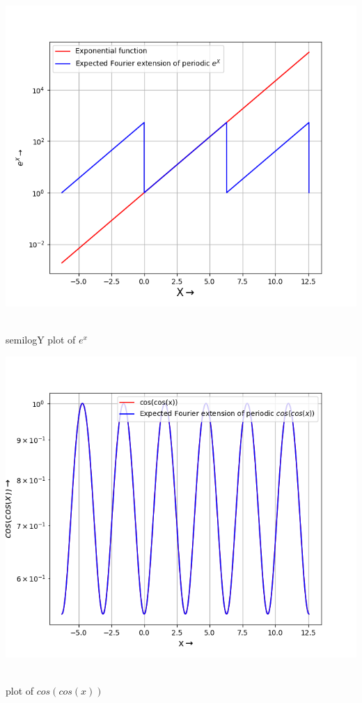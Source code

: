 \documentclass[12pt, a4paper]{report}
\begin{document}
\begin{center}
	\includegraphics[scale=0.70]{Figure_1} 
	\caption{\\semilogY plot of $e^x$}
	\label{fig:rawdata}
\end{center}
\begin{center}
	\includegraphics[scale=0.70]{Figure_2} 
	\caption{\\plot of $cos(cos(x))$}
	\label{fig:rawdata}
\end{center}
\end{document}
